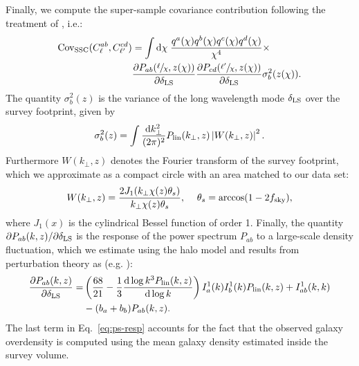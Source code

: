 \documentclass[a4paper,11pt]{article}
\begin{document}
    Finally, we compute the super-sample covariance contribution following the treatment of \cite{Krause:2017}, i.e.:
     \begin{equation}
    \begin{aligned}
       \mathrm{Cov}_{\mathrm{SSC}}(C^{ab}_{\ell}, C^{cd}_{\ell'}) &= \int \mathrm{d}\chi \;\frac{q^{a}(\chi)q^{b}(\chi)q^{c}(\chi)q^{d}(\chi)}{\chi^{4}} \times \\ &\frac{\partial P_{ab}(\sfrac{\ell}{\chi}, z(\chi))}{\partial \delta_{\rm LS}}\frac{\partial P_{cd}(\sfrac{\ell'}{\chi}, z(\chi))}{\partial \delta_{\rm LS}}\sigma^{2}_{b}(z(\chi)).
    \end{aligned}
    \end{equation}
        The quantity $\sigma_b^2(z)$ is the variance of the long wavelength mode $\delta_{\rm LS}$ over the survey footprint, given by
    \begin{equation}
      \sigma_b^2(z) = \int \frac{\mathrm{d}k_\perp^2}{(2\pi)^2}P_{\rm lin}(k_\perp,z)\left|W(k_\perp,z)\right|^2.
    \end{equation}
    Furthermore $W(k_\perp,z)$ denotes the Fourier transform of the survey footprint, which we approximate as a compact circle with an area matched to our data set:
    \begin{equation}
      W(k_\perp,z)=\frac{2 J_1(k_\perp\chi(z)\theta_s)}{k_\perp \chi(z)\theta_s},\hspace{12pt} \theta_s={\rm arccos}(1-2f_{\rm sky}),
    \end{equation}
    where $J_1(x)$ is the cylindrical Bessel function of order 1.
    Finally, the quantity $\partial P_{ab}(k, z)/\partial \delta_{\rm LS}$ is the response of the power spectrum $P_{ab}$ to a large-scale density fluctuation, which we estimate using the halo model and results from perturbation theory as (e.g. \cite{Krause:2017}):
     \begin{equation}
    \begin{aligned}
      \frac{\partial P_{ab}(k, z)}{\partial \delta_{\rm LS}} =& \left( \frac{68}{21} - \frac{1}{3}\frac{\mathrm{d}\log{k^{3} P_{\mathrm{lin}}}(k, z)}{\mathrm{d}\log k} \right) I_{a}^{1}(k)I_{b}^{1}(k)P_{\mathrm{lin}}(k, z) + I_{ab}^{1}(k, k) \\ &- (b_{a} + b_{b})P_{ab}(k, z).
    \label{eq:ps-resp}  
    \end{aligned}
     \end{equation}
    The last term in Eq.~\ref{eq:ps-resp} accounts for the fact that the observed galaxy overdensity is computed using the mean galaxy density estimated inside the survey volume.
    
\end{document}
